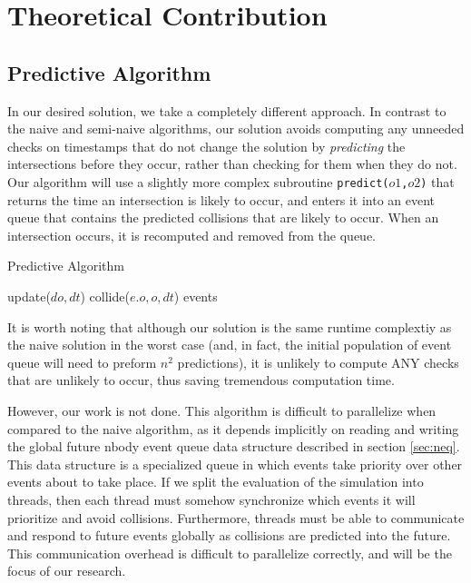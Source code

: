 \documentclass[conference]{IEEEtran}
\begin{document}
\section{Theoretical Contribution}
\label{sec:theocont}
\subsection{Predictive Algorithm}

In our desired solution, we take a completely different approach.  In contrast to the naive and semi-naive algorithms, our solution avoids computing any unneeded checks on timestamps that do not change the solution by \textit{predicting} the intersections before they occur, rather than checking for them when they do not.  Our algorithm will use a slightly more complex subroutine \texttt{predict($o1$,$o2$)} that returns the time an intersection is likely to occur, and enters it into an event queue that contains the predicted collisions that are likely to occur.  When an intersection occurs, it is recomputed and removed from the queue.

\begin{algorithm}
\caption{Predictive Algorithm}
\begin{algorithmic}
\STATE {} %
		\STATE update($do,dt$)  
		\STATE {}
					\STATE collide($e.o, o, dt$) 
				\ENDIF
			\ENDFOR
		\ENDFOR
	\ENDFOR
\ENDFOR
\RETURN events
\end{algorithmic}
\end{algorithm}

It is worth noting that although our solution is the same runtime complextiy as the naive solution in the worst case (and, in fact, the initial population of event queue will need to preform $n^2$ predictions), it is unlikely to compute ANY checks that are unlikely to occur, thus saving tremendous computation time.  

However, our work is not done.  This algorithm is difficult to parallelize when compared to the naive algorithm, as it depends implicitly on reading and writing the global future nbody event queue data structure described in section \ref{sec:neq}.  This data structure is a specialized queue in which events take priority over other events about to take place. If we split the evaluation of the simulation into threads, then each thread must somehow synchronize which events it will prioritize and avoid collisions.  Furthermore, threads must be able to communicate and respond to future events  globally as collisions are predicted into the future.  This communication overhead is difficult to parallelize correctly, and will be the focus of our research.
\end{document}
